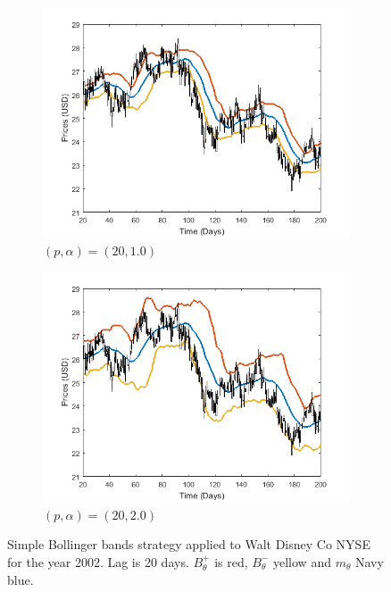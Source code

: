 \documentclass[11pt,a4,twosided,singlespacing,titlepagenumber=on]{scrreprt}
\numberwithin{equation}{chapter} %
\theoremstyle{remark}
\begin{document}
\begin{figure}[H]
    \centering
    \begin{subfigure}[t]{0.49\textwidth}
        \centering
        \includegraphics[width=1\textwidth]{bollinger/1}
        \caption{$(p, \alpha) = (20,1.0)$}
        \label{bollinger1}
    \end{subfigure}
    \begin{subfigure}[t]{0.49\textwidth}
        \centering
        \includegraphics[width=1\textwidth]{bollinger/2}
        \caption{$(p, \alpha) = (20,2.0)$}
        \label{bollinger2}
    \end{subfigure}
    \caption{Simple Bollinger bands strategy applied to Walt Disney Co NYSE for the year 2002. Lag is 20 days. $B^+_\theta$ is red, $B^-_\theta$ yellow and $m_\theta$ Navy blue.}
    \label{bollinger_bands_intro}
\end{figure}
\end{document}
